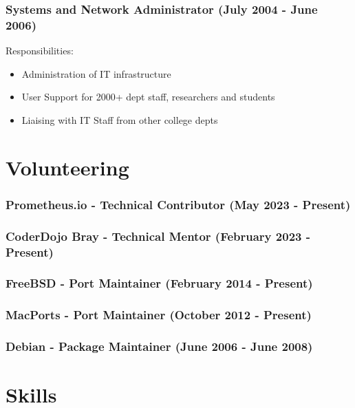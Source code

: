 \documentclass[a4paper, 10pt] {article}
\begin{document}
\subsubsection*{Systems and Network Administrator (July 2004 - June 2006)}

Responsibilities:

\begin{itemize}[itemsep=2pt,parsep=2pt]
  \item Administration of IT infrastructure
  \item User Support for 2000+ dept staff, researchers and students
  \item Liaising with IT Staff from other college depts
\end{itemize}

\hrulefill

\section*{Volunteering}

\subsubsection*{Prometheus.io - Technical Contributor (May 2023 - Present)}

\subsubsection*{CoderDojo Bray - Technical Mentor (February 2023 - Present)}

\subsubsection*{FreeBSD  - Port Maintainer (February 2014 - Present)}

\subsubsection*{MacPorts  - Port Maintainer (October 2012 - Present)}

\subsubsection*{Debian - Package Maintainer (June 2006 - June 2008)}

\hrulefill

\section*{Skills}
\end{document}
